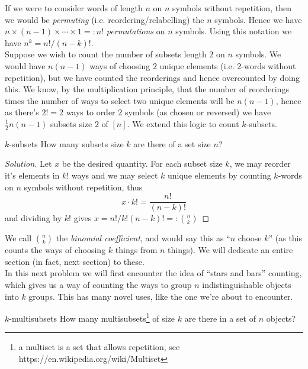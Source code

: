 \documentclass{article}
\begin{document}
If we were to consider words of length $n$ on $n$ symbols without repetition, then we would be {\it permuting} (i.e. reordering/relabelling) 
the $n$ symbols. Hence we have $n \times (n-1) \times \cdots \times 1 =: n!$ {\it permutations} on $n$ symbols. 
Using this notation we have $n^{\underline{k}} = n!/(n-k)!$. \\ 

Suppose we wish to count the number of subsets length $2$ on $n$ symbols. We would have $n(n-1)$ ways of choosing 
$2$ unique elements (i.e. $2$-words without repetition), but we have counted the reorderings and hence overcounted 
by doing this. We know, by the multiplication principle, that the number of reorderings times the number of ways 
to select two unique elements will be $n(n-1)$, hence as there's $2! = 2$ ways to order $2$ symbols (as chosen 
or reversed) we have $\frac{1}{2}n(n-1)$ subsets size $2$ of $[n]$. We extend this logic to count $k$-subsets. 

\begin{problem}[]{$k$-subsets}
    How many subsets size $k$ are there of a set size $n$?
\end{problem}

\begin{proof}[Solution]
    Let $x$ be the desired quantity. For each subset size $k$, we may reorder it's elements in $k!$ ways and we 
    may select $k$ unique elements by counting $k$-words on $n$ symbols without repetition, thus 
    \[x \cdot k! = \frac{n!}{(n-k)!}\] and dividing by $k!$ gives $x = n!/k!(n-k)! =: \binom{n}{k}$
\end{proof}

We call $\binom{n}{k}$ the {\it binomial coefficient}, and would say this as ``$n$ choose $k$'' (as this counts the ways of 
choosing $k$ things from $n$ things). We will dedicate an entire section (in fact, next section) to these. \\ 

In this next problem we will first encounter the idea of ``stars and bars'' counting, which gives us a way of counting 
the ways to group $n$ indistinguishable objects into $k$ groups. This has many novel uses, like the one we're 
about to encounter. 

\begin{problem}[]{$k$-multisubsets}
    How many multisubsets\footnote{a multiset is a set that allows repetition, see https://en.wikipedia.org/wiki/Multiset} of size $k$ are there
    in a set of $n$ objects?
\end{problem}
\end{document}
